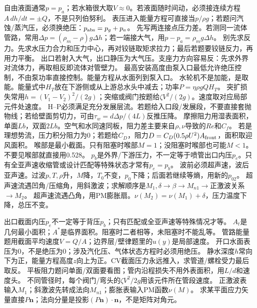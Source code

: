 自由液面通常$p=p_a$；若水箱很大取$V\approx0$。若液面随时间动，必须接连续方程$A\,dh/dt=\pm Q$，不是只列伯努利。
表压进入能量方程可直接当$p/\rho g$；若题问汽蚀/蒸汽压，必须换绝压：$p_{\rm abs}=p_g+p_a$。
先写两连接点压力差。若测同一流体管路，常用$\Delta p=(\rho_m-\rho)g\Delta h$；若一端接大气，用$p-p_a=\rho_m g\Delta h$。
别先求反力。先求水压力合力和压力中心，再对铰链取矩求拉力；最后若题要铰链反力，再用力平衡。
出口若射入大气，出口静压为大气压。支座力方向容易反：先求外界对流体力，再取相反即流体对管壁力。
最高安装高度由泵入口最低允许绝压控制，不由泵功率直接控制。能量方程从水面列到泵入口。
水轮机不是加能，是取能。能量式中$H_T$放在下游侧或从上游总水头中减去；功率$P=\eta\rho gQH_T$。
突扩损失常用$h=(V_1-V_2)^2/(2g)$；突缩或阀门按题给$\zeta V^2/(2g)$。速度取对应局部元件处速度。
H--P必须满足充分发展层流。若题给入口段/发展段，不要直接套抛物线；若给壁面剪切力，可由$\tau_w=d\Delta p/(4L)$反推压降。
摩擦阻力用湿表面积，单面$Lb$，双面$2Lb$。空气和水同速同板，阻力差主要来自$\rho,\nu$导致的$Re$和$C_f$。
若是理想势流，压力积分阻力为0；若题给$C_D$，阻力$D=C_D(0.5\rho U^2)A_{\rm front}$，面积取迎风面积。
喉部是最小截面。只有阻塞时喉部$M=1$；没阻塞时喉部也可能$M<1$。不要见喉部就直接用0.528。
$p_b$是外界/下游压力，不一定等于喷管出口内压$p_e$。只有全亚声速收缩管或设计匹配等特殊状态才常有$p_e=p_b$。
波前必须超声速，波后亚声速。过波$p,T,\rho$升，$M$降，$T_0$不变，$p_0$下降；后面若继续等熵，用新的$p_{02}$。
超声速流遇凹角/压缩角，用斜激波；求解顺序是$M_1,\delta\to\beta\to M_{n1}\to$正激波关系$\to M_2$。
超声速流遇凸角，用PM膨胀扇。$\nu(M_2)=\nu(M_1)+\delta$，压力温度下降，总压不变。

出口截面内压$p_e$不一定等于背压$p_b$；只有匹配或全亚声速等特殊情况才等。
$A_t$是几何最小面积；$A^*$是临界面积。阻塞时二者相等，未阻塞时不能乱等。
管路能量题用截面平均速度$V=Q/A$；边界层/壁律题里的$u(y)$是局部速度。
开口水面表压为0，不是绝压为0；涉及汽化压、气体状态方程时必须用绝压。
静水深度$h$常向下为正，能量方程高度$z$向上为正。CV截面压力永远推入，求管道/螺栓受力最后取反。
平板阻力题问单面/双面要看图；管内沿程损失不用外表面积，用$L/d$和速度头。
不同管径时，每个阀门/弯头的$\zeta V^2/2g$用该元件所在管段速度。
正激波表输入$M_1$；斜激波先转成法向$M_{n1}$；膨胀表输入PM函数$\nu(M)$。
求某平面应力矢量直接$P\bm n$；法向分量是投影$(P\bm n)\cdot\bm n$，不是矩阵对角元。

